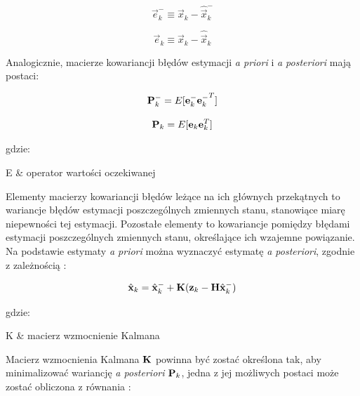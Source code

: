 \begin{equation}
\label{equ:Filtr_Kalmana_blad_a_priori}
	\vec{e}_k^- \equiv \vec{x}_k - \hat{\vec{x}}_k^-
\end{equation}

\begin{equation}
\label{equ:Filtr_Kalmana_a_posteriori}
	\vec{e}_k \equiv \vec{x}_k - \hat{\vec{x}}_k
\end{equation}

Analogicznie, macierze kowariancji błędów estymacji \textit{a priori} i \textit{a posteriori} mają postaci:

\begin{equation}
\label{equ:Filtr_Kalmana_macierz_kowariancji_a_priori}
	\mathbf{P}_k^- = E[\mathbf{e}_k^- {\mathbf{e}_k^-}^T]
\end{equation}

\begin{equation}
\label{equ:Filtr_Kalmana_macierz_kowariancji_a_posteriori}
	\mathbf{P}_k = E[\mathbf{e}_k \mathbf{e}_k^T]
\end{equation}

\noindent
gdzie:

\begin{conditions}
	E & operator wartości oczekiwanej \\
\end{conditions}

Elementy macierzy kowariancji błędów leżące na ich głównych przekątnych to wariancje błędów estymacji poszczególnych zmiennych stanu, stanowiące miarę niepewności tej estymacji. Pozostałe elementy to kowariancje pomiędzy błędami estymacji poszczególnych zmiennych stanu, określające ich wzajemne powiązanie. Na podstawie estymaty \textit{a priori} można wyznaczyć estymatę \textit{a posteriori}, zgodnie z zależnością \cite{Welch1995}:

\begin{equation}
\label{equ:Filtr_Kalmana_wyznaczenie_estymaty_a_posteriori}
	\hat{\vec{x}}_k = \hat{\vec{x}}_k^- + \matr{K}(\vec{z}_k - \matr{H}\hat{\vec{x}}_k^-)
\end{equation}

\noindent
gdzie:

\begin{conditions}
	K & macierz wzmocnienie Kalmana \\
\end{conditions}

Macierz wzmocnienia Kalmana $\mathbf{K}$ powinna być zostać określona tak, aby minimalizować wariancję \textit{a posteriori} $\mathbf{P}_k$, jedna z jej możliwych postaci może zostać obliczona z równania \cite{Welch1995}:

